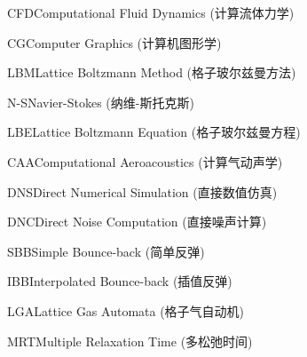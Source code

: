 
\begin{nomenclatures}[缩写]
  \item{CFD}{Computational Fluid Dynamics (计算流体力学)}
  \item{CG}{Computer Graphics (计算机图形学)}
  \item{LBM}{Lattice Boltzmann Method (格子玻尔兹曼方法)}
  \item{N-S}{Navier-Stokes (纳维-斯托克斯)}
  \item{LBE}{Lattice Boltzmann Equation (格子玻尔兹曼方程)}
  \item{CAA}{Computational Aeroacoustics (计算气动声学)}
  \item{DNS}{Direct Numerical Simulation (直接数值仿真)}
  \item{DNC}{Direct Noise Computation (直接噪声计算)}
  \item{SBB}{Simple Bounce-back (简单反弹)}
  \item{IBB}{Interpolated Bounce-back (插值反弹)}
  \item{LGA}{Lattice Gas Automata (格子气自动机)}
  \item{MRT}{Multiple Relaxation Time (多松弛时间)}
\end{nomenclatures}

